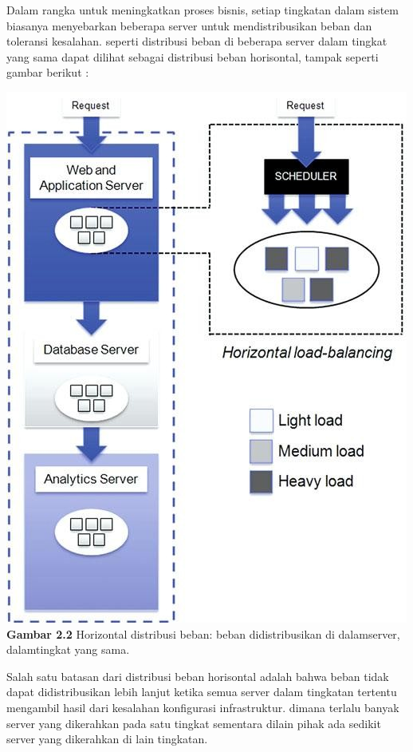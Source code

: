 Dalam rangka untuk meningkatkan proses bisnis, setiap tingkatan dalam sistem biasanya menyebarkan beberapa server untuk mendistribusikan beban dan toleransi kesalahan. seperti distribusi beban di beberapa server dalam tingkat yang sama dapat dilihat sebagai distribusi beban horisontal, tampak seperti gambar berikut :\\
\begin{center}
\includegraphics[scale=1]{gambar22.jpg} \\
\textbf{Gambar 2.2} Horizontal distribusi beban: beban didistribusikan di dalamserver, dalamtingkat yang sama.
\end{center}
Salah satu batasan dari distribusi beban horisontal adalah bahwa beban tidak dapat didistribusikan lebih lanjut ketika semua server dalam tingkatan tertentu mengambil hasil dari kesalahan konfigurasi infrastruktur. dimana terlalu banyak server yang dikerahkan pada satu tingkat sementara dilain pihak ada sedikit server yang dikerahkan di lain tingkatan.\\
